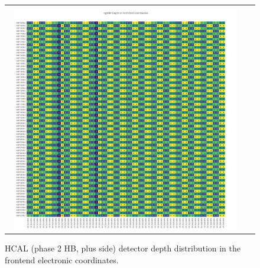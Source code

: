 \begin{figure}[htb]
 \begin{center}
  \begin{tabular}{cc}
   \includegraphics[angle=0,width=0.95\textwidth]{figures/appendix/ngHBP_Depth_in_FrontEnd.png}
  \end{tabular}
	\caption{HCAL (phase 2 HB, plus side) detector depth distribution in the frontend electronic coordinates.}
  \label{fig:lmapngHBPDepthFEC}
 \end{center}
\end{figure}
\clearpage

